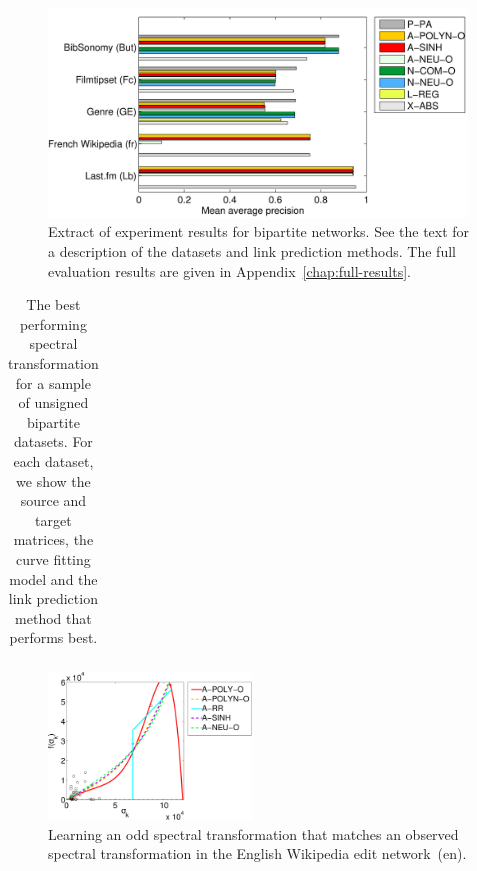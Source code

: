 \documentclass[11pt,a4paper]{book}
\newcommand{\wFull}{0.99}
\newcommand{\wTwo}{0.48}
\begin{document}
\begin{figure}[h!]
  \includegraphics[width=\wFull\textwidth]{img-eps/resultsbar-bip}
  \caption{
    Extract of experiment results for bipartite networks.  See the text for a
    description of the datasets and link prediction methods. 
    The full evaluation results are given in
    Appendix~\ref{chap:full-results}. 
  }
  \label{fig:results-bip}
\end{figure}

\begin{table}
  \centering
  \caption{
    The best performing spectral transformation for a sample of unsigned 
    bipartite datasets. 
    For each dataset, we show the source and target matrices, the curve
    fitting model and the link prediction method that performs best. 
  }
  \begin{tabular}{ lllll }
    \toprule
    
    \midrule
    
    \bottomrule
  \end{tabular}			
  \label{tab:bestcurve-bipartite}
\end{table}

\begin{figure}[h!]
  \centering
  \includegraphics[width=\wTwo\textwidth]{img-svg/curve.bipf.edit-enwiki.a.clean} 
  \caption{
    Learning an odd spectral transformation that matches an observed spectral
    transformation in the English Wikipedia edit network~(\textsf{en}). 
  }
  \label{fig:bipartite-curve-fitting}
\end{figure}
\end{document}
